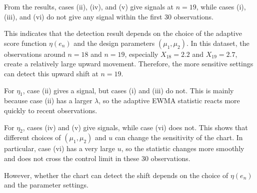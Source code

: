\documentclass[a4paper, 12pt]{article}  %
\begin{document}
From the results, cases (ii), (iv), and (v) give signals at \(n=19\), while cases (i), (iii), and (vi) do not give any signal within the first 30 observations.

This indicates that the detection result depends on the choice of the adaptive score function \(\eta(e_n)\) and the design parameters \((\mu_1,\mu_2)\). In this dataset, the observations around \(n=18\) and \(n=19\), especially \(X_{18}=2.2\) and \(X_{19}=2.7\), create a relatively large upward movement. Therefore, the more sensitive settings can detect this upward shift at \(n=19\).

For \(\eta_1\), case (ii) gives a signal, but cases (i) and (iii) do not. This is mainly because case (ii) has a larger \(\lambda\), so the adaptive EWMA statistic reacts more quickly to recent observations.

For \(\eta_2\), cases (iv) and (v) give signals, while case (vi) does not. This shows that different choices of \((\mu_1,\mu_2)\) and \(u\) can change the sensitivity of the chart. In particular, case (vi) has a very large \(u\), so the statistic changes more smoothly and does not cross the control limit in these 30 observations.

However, whether the chart can detect the shift depends on the choice of \(\eta(e_n)\) and the parameter settings.
\end{document}
